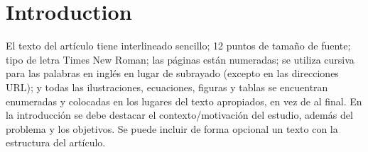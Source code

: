 \section{Introduction}
\label{sec:intro}
El texto del artículo tiene interlineado sencillo; 12 puntos de tamaño de fuente; tipo de letra Times New Roman; las páginas están numeradas; se utiliza cursiva para las palabras en inglés en lugar de subrayado (excepto en las direcciones URL); y todas las ilustraciones, ecuaciones, figuras y tablas se encuentran enumeradas y colocadas en los lugares del texto apropiados, en vez de al final.
En la introducción se debe destacar el contexto/motivación del estudio, además del problema y los objetivos. Se puede incluir de forma opcional un texto con la estructura del artículo.
